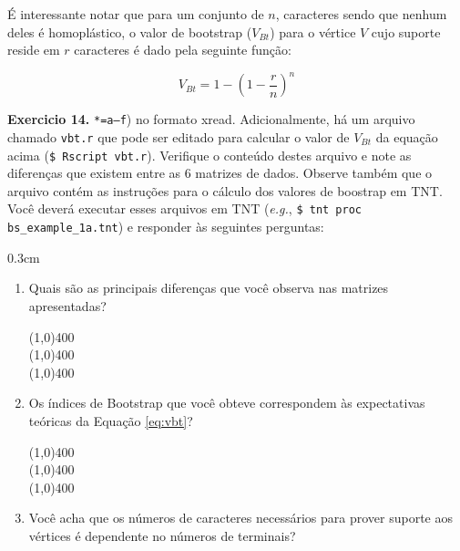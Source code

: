 \begin{refsection}
É interessante notar que para um conjunto de $n$, caracteres sendo que nenhum deles é homoplástico, o valor de bootstrap ($V_{Bt}$) para o vértice $V$ cujo suporte reside em $r$ caracteres é dado pela seguinte função:

\begin{center}
\begin{equation}\label{eq:vbt}
V_{Bt}=1-(1-\dfrac{r}{n})^n
\end{equation}
\end{center}


\begin{blackBlock}{\textbf{Exercicio 14.}}\label{tut14:ex:14.1}
\texttt{*=a--f}) no formato xread. Adicionalmente, há um arquivo chamado \texttt{vbt.r} que pode ser editado para calcular o valor de $V_{Bt}$ da equação acima (\texttt{\$ Rscript vbt.r}). Verifique o conteúdo destes arquivo e note as diferenças que existem entre as 6 matrizes de dados. Observe também que o arquivo contém as instruções para o cálculo dos valores de boostrap em TNT. Você deverá executar esses arquivos em TNT (\textit{e.g.}, \texttt{\$ tnt proc bs\_example\_1a.tnt}) e responder às seguintes perguntas:

\end{blackBlock}


\begin {myindentpar}{0.3cm}
\begin{enumerate}[\itshape 1.]

	\item{Quais são as principais diferenças que você observa nas matrizes apresentadas?}


\begin{center}
\line(1,0){400}\\
\line(1,0){400}\\
\line(1,0){400}\\
\end{center}


	\item{Os índices de Bootstrap que você obteve correspondem às expectativas teóricas da Equação \ref{eq:vbt}?}

\begin{center}
\line(1,0){400}\\
\line(1,0){400}\\
\line(1,0){400}\\
\end{center}

	\item{Você acha que os números de caracteres necessários para prover suporte aos vértices é dependente no números de terminais?}



\end{enumerate}
\end{myindentpar}
\end{refsection}
